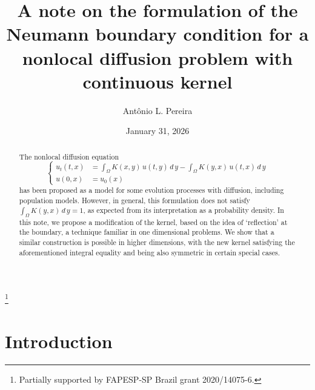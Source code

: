\documentclass[a4paper,12pt]{amsart}
\begin{document}
\title[\hfil  Neumann condition for a nonlocal  problem]
{A note on the formulation of the Neumann boundary condition for a nonlocal diffusion problem with continuous kernel}

\author[A. L. Pereira]
{Ant\^onio L. Pereira}

\address{Ant\^onio L. Pereira \hfill\break
Instituto de Matem\'atica e Estat\'istica,
Universidade de S\~ao Paulo,
S\~ao Paulo, Brazil}

\thanks {Partially supported by FAPESP-SP Brazil grant 2020/14075-6.}


\date{January 31, 2026}

\begin{abstract}
The nonlocal diffusion equation
\begin{equation*}
      \begin{cases} u_t(t,x) & = \int_{\Omega}   K(x,y) \,
       u(t,y) \,  d\,y
      -  \int_{\Omega}   K(y,x) \, u(t,x) \, d \, y \\
      u(0,x) & = u_0(x)
      \end{cases}
     \end{equation*}
    has been proposed as a model for some evolution processes with diffusion, including population models. However, in general, this formulation does not satisfy
$  \int_{\Omega}   K(y,x)  \, d \, y = 1$, as
 expected  from  its interpretation  as a probability density.
 In this note, we propose a modification of the kernel, based on the idea of `reflection' at the boundary, a technique familiar in one dimensional problems. We show that a similar construction is possible in higher dimensions, with the new kernel satisfying the aforementioned integral equality and being  also symmetric in certain special cases.
\end{abstract}

\maketitle

\section{Introduction}
\end{document}
